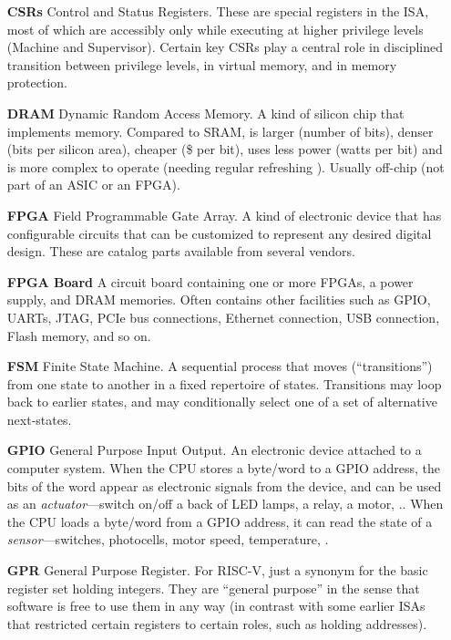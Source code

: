 \begin{itemize}
\item[\bf CSRs] Control and Status Registers.  These are special
  registers in the ISA, most of which are accessibly only while
  executing at higher privilege levels (Machine and Supervisor).
  Certain key CSRs play a central role in disciplined transition
  between privilege levels, in virtual memory, and in memory
  protection.

\item[\bf DRAM] Dynamic Random Access Memory.  A kind of silicon chip
  that implements memory.  Compared to SRAM, is larger (number of
  bits), denser (bits per silicon area), cheaper (\$ per bit), uses
  less power (watts per bit) and is more complex to operate (needing
  regular refreshing {\etc}). Usually off-chip (not part of an ASIC or
  an FPGA).

\item[\bf FPGA] Field Programmable Gate Array.  A kind of electronic
  device that has configurable circuits that can be customized to
  represent any desired digital design.  These are catalog parts
  available from several vendors.

\item[\bf FPGA Board] A circuit board containing one or more FPGAs, a
  power supply, and DRAM memories.  Often contains other facilities
  such as GPIO, UARTs, JTAG, PCIe bus connections, Ethernet
  connection, USB connection, Flash memory, and so on.

\item[\bf FSM] Finite State Machine.  A sequential process that moves
  (``transitions'') from one state to another in a fixed repertoire of
  states.  Transitions may loop back to earlier states, and may
  conditionally select one of a set of alternative next-states.

\item[\bf GPIO] General Purpose Input Output.  An electronic device
  attached to a computer system. When the CPU stores a byte/word to a
  GPIO address, the bits of the word appear as electronic signals from
  the device, and can be used as an \emph{actuator}---switch on/off a
  back of LED lamps, a relay, a motor, {\etc.}.  When the CPU loads a
  byte/word from a GPIO address, it can read the state of a
  \emph{sensor}---switches, photocells, motor speed, temperature,
  {\etc.}

\item[\bf GPR] General Purpose Register.  For RISC-V, just a synonym
  for the basic register set holding integers.  They are ``general
  purpose'' in the sense that software is free to use them in any way
  (in contrast with some earlier ISAs that restricted certain
  registers to certain roles, such as holding addresses).


\end{itemize}
